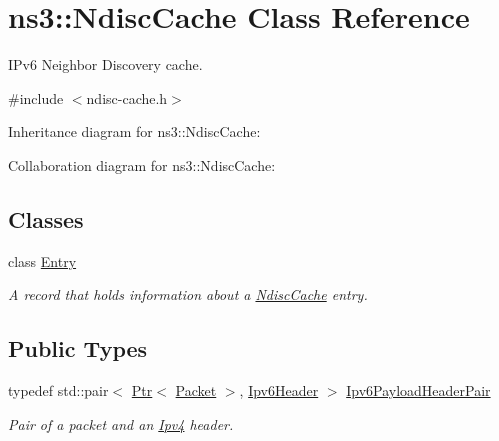 \hypertarget{classns3_1_1NdiscCache}{}\section{ns3\+:\+:Ndisc\+Cache Class Reference}
\label{classns3_1_1NdiscCache}


I\+Pv6 Neighbor Discovery cache.  




{\ttfamily \#include $<$ndisc-\/cache.\+h$>$}



Inheritance diagram for ns3\+:\+:Ndisc\+Cache\+:


Collaboration diagram for ns3\+:\+:Ndisc\+Cache\+:
\subsection*{Classes}
\begin{DoxyCompactItemize}
\item 
class \hyperlink{classns3_1_1NdiscCache_1_1Entry}{Entry}
\begin{DoxyCompactList}\small\item\em A record that holds information about a \hyperlink{classns3_1_1NdiscCache}{Ndisc\+Cache} entry. \end{DoxyCompactList}\end{DoxyCompactItemize}
\subsection*{Public Types}
\begin{DoxyCompactItemize}
\item 
typedef std\+::pair$<$ \hyperlink{classns3_1_1Ptr}{Ptr}$<$ \hyperlink{classns3_1_1Packet}{Packet} $>$, \hyperlink{classns3_1_1Ipv6Header}{Ipv6\+Header} $>$ \hyperlink{classns3_1_1NdiscCache_a29c07f4c9da0e923f442f6440666240e}{Ipv6\+Payload\+Header\+Pair}
\begin{DoxyCompactList}\small\item\em Pair of a packet and an \hyperlink{classns3_1_1Ipv4}{Ipv4} header. \end{DoxyCompactList}\end{DoxyCompactItemize}

